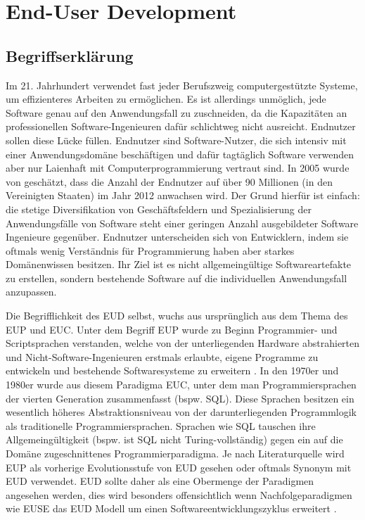 
\section{End-User Development}
\subsection{Begriffserklärung}
Im 21. Jahrhundert verwendet fast jeder Berufszweig computergestützte Systeme, um effizienteres Arbeiten zu ermöglichen. Es ist allerdings unmöglich, jede Software genau auf den Anwendungsfall zu zuschneiden, da die Kapazitäten an professionellen Software-Ingenieuren dafür schlichtweg nicht ausreicht. Endnutzer sollen diese Lücke füllen. Endnutzer sind Software-Nutzer, die sich intensiv mit einer Anwendungsdomäne beschäftigen und dafür tagtäglich Software verwenden aber nur Laienhaft mit Computerprogrammierung vertraut sind. In 2005 wurde von \cite{Scaffidi2005eudnumbers} geschätzt, dass die Anzahl der Endnutzer auf über 90 Millionen (in den Vereinigten Staaten) im Jahr 2012 anwachsen wird. Der Grund hierfür ist einfach: die stetige Diversifikation von Geschäftsfeldern und Spezialisierung der Anwendungsfälle von Software steht einer geringen Anzahl ausgebildeter Software Ingenieure gegenüber. Endnutzer unterscheiden sich von Entwicklern, indem sie oftmals wenig Verständnis für Programmierung haben aber starkes Domänenwissen besitzen. Ihr Ziel ist es nicht allgemeingültige Softwareartefakte zu erstellen, sondern bestehende Software auf die individuellen Anwendungsfall anzupassen.

Die Begrifflichkeit des \acf{EUD} selbst, wuchs aus ursprünglich aus dem Thema des \ac{EUP} und \ac{EUC}. Unter dem Begriff \ac{EUP} wurde zu Beginn Programmier- und Scriptsprachen verstanden, welche von der unterliegenden Hardware abstrahierten und Nicht-Software-Ingenieuren erstmals erlaubte, eigene Programme zu entwickeln und bestehende Softwaresysteme zu erweitern \cite{Ko2011EUSE}. In den 1970er und 1980er wurde aus diesem  Paradigma \ac{EUC}, unter dem man Programmiersprachen der vierten Generation zusammenfasst (bspw. SQL). Diese Sprachen besitzen ein wesentlich höheres Abstraktionsniveau von der darunterliegenden Programmlogik als traditionelle Programmiersprachen. Sprachen wie SQL tauschen ihre Allgemeingültigkeit (bspw. ist SQL nicht Turing-vollständig) gegen ein auf die Domäne zugeschnittenes Programmierparadigma. Je nach Literaturquelle wird \ac{EUP} als vorherige Evolutionsstufe von \ac{EUD} gesehen oder oftmals Synonym mit \ac{EUD} verwendet. \ac{EUD} sollte daher als eine Obermenge der Paradigmen angesehen werden, dies wird besonders offensichtlich wenn Nachfolgeparadigmen wie \ac{EUSE} das \ac{EUD} Modell um einen Softwareentwicklungszyklus erweitert \cite{Ko2011EUSE}.

